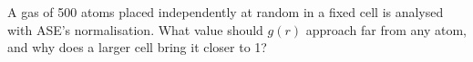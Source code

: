 
\begin{selfcheck}
A gas of 500 atoms placed independently at random in a fixed cell is
analysed with ASE's
normalisation. What value should $g(r)$ approach far from any atom, and
why does a larger cell bring it closer to 1?
\end{selfcheck}
